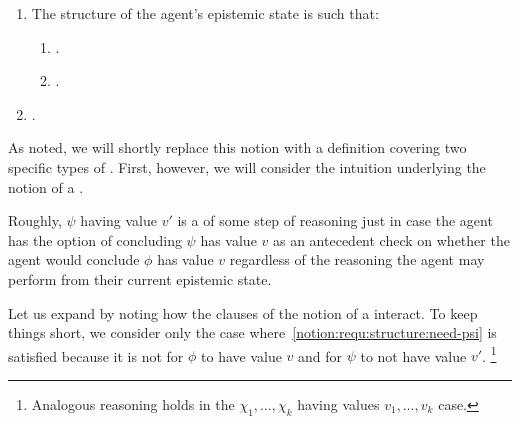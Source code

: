 \begin{note}
  {
    \color{red}
    \begin{enumerate}[label=\arabic*., ref=\named{\dag \Re:\arabic*}]
    \item
      \label{notion:requ:structure}
      The structure of the agent's epistemic state is such that:
      \begin{enumerate}[label=\alph*., ref=\named{\dag \Re:1\alph*}]
      \item
        \label{notion:requ:structure:psi}
        \requNotionEpVAd{}.
      \item
        \label{notion:requ:structure:need-psi}
        \requNotionSubset{}.
      \end{enumerate}
    \item
      \label{notion:requ:possible-psi}
      \requNotionReasoningUC{}.
    \end{enumerate}
  }
\end{note}

\begin{note}
  As noted, we will shortly replace this notion with a definition covering two specific types of \requ{}.
  First, however, we will consider the intuition underlying the notion of a \requ{}.

  Roughly, \(\psi\) having value \(v'\) is a \requ{} of some step of reasoning just in case the agent has the option of concluding \(\psi\) has value \(v\) as an antecedent check on whether the agent would conclude \(\phi\) has value \(v\) regardless of the reasoning the agent may perform from their current epistemic state.
\end{note}

\begin{note}[Expanding]
  Let us expand by noting how the clauses of the notion of a \requ{} interact.
  To keep things short, we consider only the case where~\ref{notion:requ:structure:need-psi} is satisfied because it is not \epVAd{} for \(\phi\) to have value \(v\) and for \(\psi\) to not have value \(v'\).\nolinebreak
  \footnote{
    Analogous reasoning holds in the \(\chi_{1},\dots,\chi_{k}\) having values \(v_{1},\dots,v_{k}\) case.
  }
\end{note}

